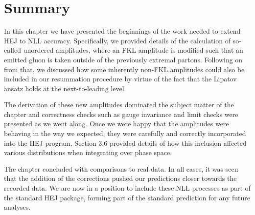 


\section{Summary}
In this chapter we have presented the beginnings of the work needed to extend HEJ to NLL accuracy. Specifically, we provided details of the calculation of so-called unordered amplitudes, where an FKL amplitude is modified such that an emitted gluon is taken outside of the previously extremal partons. Following on from that, we discussed how some inherently non-FKL amplitudes could also be included in our resummation procedure by virtue of the fact that the Lipatov ansatz holds at the next-to-leading level.

The derivation of these new amplitudes dominated the subject matter of the chapter and correctness checks such as gauge invariance and limit checks were presented as we went along. Once we were happy that the amplitudes were behaving in the way we expected, they were carefully and correctly incorporated into the HEJ program. Section 3.6 provided details of how this inclusion affected various distributions when integrating over phase space. 

The chapter concluded with comparisons to real data. In all cases, it was seen that the addition of the corrections pushed our predictions closer towards the recorded data. We are now in a position to include these NLL processes as part of the standard HEJ package, forming part of the standard prediction for any future analyses. 
